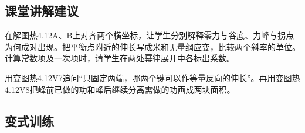 \documentclass[UTF8,fontset=fandol,a4paper,11pt]{ctexart}
\begin{document}


\subsection*{课堂讲解建议}

在解图热4.12A、B上对齐两个横坐标，让学生分别解释零力与谷底、力峰与拐点为何成对出现。把平衡点附近的伸长写成米和无量纲应变，比较两个斜率的单位。计算常数项及一次项时，请学生在两处幂律展开中各标出系数。

用变图热4.12V7追问“只固定两端，哪两个键可以作等量反向的伸长”。再用变图热4.12V8把峰前已做的功和峰后继续分离需做的功画成两块面积。



\subsection*{变式训练}
\end{document}
